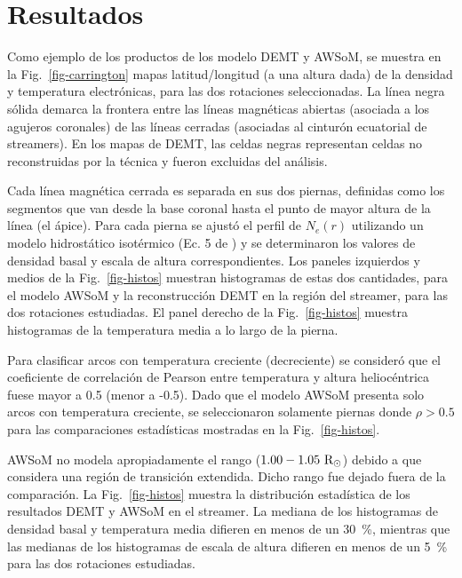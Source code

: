 \documentclass[baaa]{baaa}
\begin{document}
\section{Resultados}
Como ejemplo de los productos de los modelo DEMT y AWSoM, se muestra en la Fig.~\ref{fig-carrington} mapas 
latitud/longitud (a una altura dada) de la densidad y temperatura electrónicas, para las dos rotaciones seleccionadas. 
La línea negra sólida demarca la frontera entre las líneas magnéticas abiertas (asociada a los agujeros coronales) de 
las líneas cerradas (asociadas al cinturón ecuatorial de streamers). En los mapas de DEMT, las celdas negras 
representan celdas no reconstruidas por la técnica y fueron excluidas del análisis.


Cada línea magnética cerrada es separada en sus dos piernas, definidas como los segmentos que van desde la base coronal 
hasta el punto de mayor altura de la línea (el ápice). Para cada pierna se ajustó el perfil de $N_e(r)$ utilizando un 
modelo hidrostático isotérmico (Ec. 5 de \citealt{lloveras_2017}) y se determinaron los valores de densidad basal y 
escala de altura correspondientes. Los paneles izquierdos y medios de la Fig.~\ref{fig-histos} muestran histogramas 
de estas dos cantidades, para el modelo AWSoM y la reconstrucción DEMT en la región del streamer, para las dos 
rotaciones 
estudiadas. El panel derecho de la Fig.~\ref{fig-histos} muestra histogramas de la temperatura media a lo largo de la 
pierna.

Para clasificar arcos con temperatura creciente (decreciente) se consideró que el coeficiente de correlación de Pearson 
entre temperatura y altura heliocéntrica fuese mayor a 0.5 (menor a -0.5). Dado que el modelo AWSoM presenta solo arcos 
con temperatura creciente, se seleccionaron solamente piernas donde $\rho> 0.5$ para las comparaciones estadísticas 
mostradas en la Fig.~\ref{fig-histos}.

AWSoM no modela apropiadamente el rango ($1.00 - 1.05~{\rm R_\odot}$) debido a que considera una región de transición 
extendida. Dicho rango fue dejado fuera de la comparación. La Fig.~\ref{fig-histos} muestra la distribución estadística 
de los resultados DEMT y AWSoM en el streamer. La mediana de los histogramas de densidad basal y temperatura media 
difieren en menos de un 30~\%, mientras que las medianas de los histogramas de escala de altura difieren en menos de un 
5~\% para las dos rotaciones estudiadas.
\end{document}
